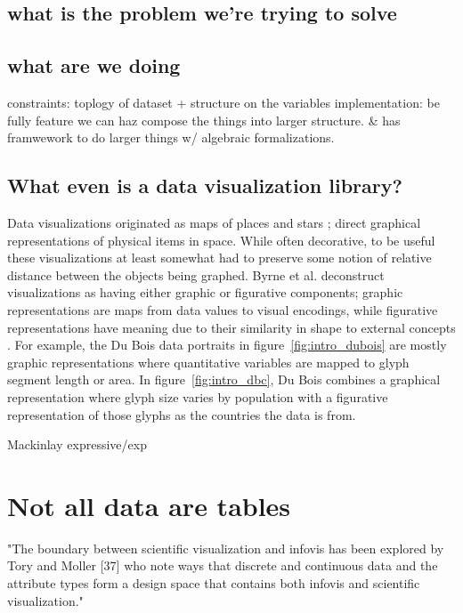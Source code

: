 \documentclass[../main.tex]{subfiles}
\begin{document}
\subsection{what is the problem we're trying to solve}



\subsection{what are we doing}
constraints: toplogy of dataset + structure on the variables
implementation: be fully feature
we can haz compose the things into larger structure. \& has framwework to do larger things w/ algebraic formalizations.



\subsection{What even is a data visualization library?}
Data visualizations originated as maps of places and stars \cite{friendlyBriefHistoryData2008}; direct graphical representations of physical items in space. While often decorative, to be useful these visualizations at least somewhat had to preserve some notion of relative distance between the objects being graphed. Byrne et al. deconstruct  visualizations as having either graphic or figurative components; graphic representations are maps from data values to visual encodings, while figurative representations have meaning due to their similarity in shape to external concepts \cite{byrneAcquiredCodesMeaning2016}. For example, the Du Bois data portraits in figure~\ref{fig:intro_dubois} are mostly graphic representations where quantitative variables are mapped to glyph segment length or area. In figure~\ref{fig:intro_dbc}, Du Bois combines a graphical representation where glyph size varies by population with a figurative representation of those glyphs as the countries the data is from. 

Mackinlay expressive/exp







\section{Not all data are tables}

"The boundary between scientific visualization and infovis has been explored by Tory and Moller [37] who note ways that discrete and continuous data and the attribute types form a design space that contains both infovis and scientific visualization." \cite{pousmanCasualInformation2007}
\end{document}
